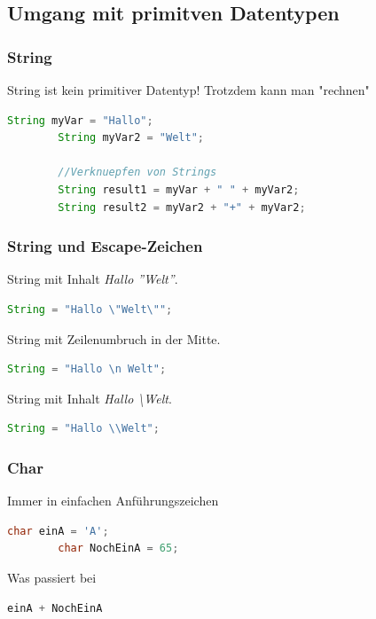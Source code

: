 \documentclass[18pt]{beamer}
\begin{document}
\subsection{Umgang mit primitven Datentypen}
\begin{frame}[fragile]
	\frametitle{String}
	
	String ist kein primitiver Datentyp!
	Trotzdem kann man "rechnen"
	
	\begin{lstlisting}[language=java]
		String myVar = "Hallo";		
		String myVar2 = "Welt"; 
		
		//Verknuepfen von Strings
		String result1 = myVar + " " + myVar2;
		String result2 = myVar2 + "+" + myVar2;
	\end{lstlisting}
\end{frame}


\begin{frame}[fragile]
	\frametitle{String und Escape-Zeichen}
	
	String mit Inhalt \emph{Hallo ''Welt''}.
	\begin{lstlisting}[language=java]
		String = "Hallo \"Welt\"";
	\end{lstlisting}
	\pause
	
	
	String mit Zeilenumbruch in der Mitte.
	\begin{lstlisting}[language=java]
		String = "Hallo \n Welt";
	\end{lstlisting}
	\pause
	
	
	String mit Inhalt \emph{Hallo \textbackslash Welt}.
	\begin{lstlisting}[language=java]
		String = "Hallo \\Welt";
	\end{lstlisting}
\end{frame}


\begin{frame}[fragile]
	\frametitle{Char}
	
	Immer in einfachen Anführungszeichen
	\begin{lstlisting}[language=java]
		char einA = 'A';
		char NochEinA = 65;
	\end{lstlisting}
	Was passiert bei 
	\begin{lstlisting}[language=java]
	einA + NochEinA
	\end{lstlisting}	
\end{frame}
\end{document}
